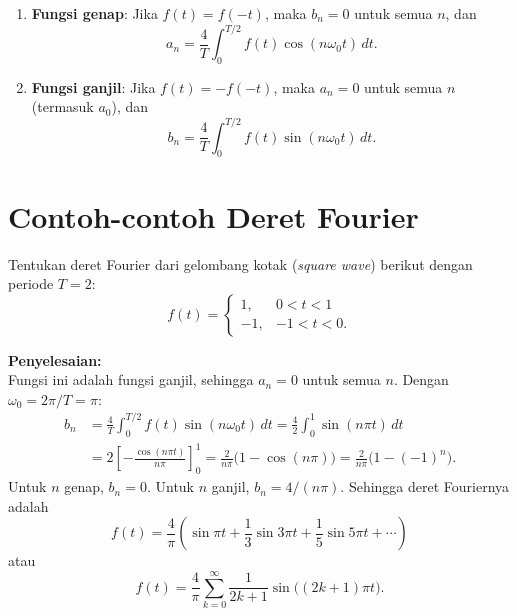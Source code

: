 \begin{enumerate}
\item \textbf{Fungsi genap}: Jika $f(t) = f(-t)$, maka $b_n = 0$ untuk semua $n$, dan
\[
a_n = \frac{4}{T}\int_{0}^{T/2} f(t)\cos(n\omega_0 t)\,dt.
\]
\item \textbf{Fungsi ganjil}: Jika $f(t) = -f(-t)$, maka $a_n = 0$ untuk semua $n$ (termasuk $a_0$), dan
\[
b_n = \frac{4}{T}\int_{0}^{T/2} f(t)\sin(n\omega_0 t)\,dt.
\]
\end{enumerate}

\section{Contoh-contoh Deret Fourier}

\begin{exmp}
\label{ex:gelombang-kotak}
Tentukan deret Fourier dari gelombang kotak (\textit{square wave}) berikut dengan periode $T = 2$:
\[
f(t) = \begin{cases} 1, & 0 < t < 1 \\ -1, & -1 < t < 0. \end{cases}
\]

\textbf{Penyelesaian:}\\
Fungsi ini adalah fungsi ganjil, sehingga $a_n = 0$ untuk semua $n$. Dengan $\omega_0 = 2\pi/T = \pi$:
\begin{align*}
b_n &= \frac{4}{T}\int_{0}^{T/2} f(t)\sin(n\omega_0 t)\,dt
     = \frac{4}{2}\int_{0}^{1} \sin(n\pi t)\,dt \\
    &= 2\left[-\frac{\cos(n\pi t)}{n\pi}\right]_0^1
     = \frac{2}{n\pi}\bigl(1 - \cos(n\pi)\bigr)
     = \frac{2}{n\pi}\bigl(1-(-1)^n\bigr).
\end{align*}
Untuk $n$ genap, $b_n = 0$. Untuk $n$ ganjil, $b_n = 4/(n\pi)$. Sehingga deret Fouriernya adalah
\[
f(t) = \frac{4}{\pi}\left(\sin\pi t + \frac{1}{3}\sin 3\pi t + \frac{1}{5}\sin 5\pi t + \cdots\right)
\]
atau
\[
f(t) = \frac{4}{\pi}\sum_{k=0}^{\infty}\frac{1}{2k+1}\sin\bigl((2k+1)\pi t\bigr).
\]
\end{exmp}

